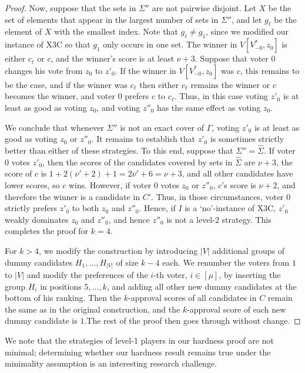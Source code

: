 \documentclass[11pt]{article}
\begin{document}
\begin{proof}
Now, suppose that the sets in $\Sigma''$ are not pairwise disjoint. 
Let $X$ be the set of elements that appear in the largest
number of sets in $\Sigma''$, and let $g_\ell$ be the element of $X$
with the smallest index. Note that $g_\ell\neq g_1$, since we modified our instance of X3C so that 
$g_1$ only occurs in one set.
The winner in $V[V^*_{-0}, z_0]$ is either $c_\ell$ or $c$, and the winner's score is at least $\nu+3$.
Suppose that voter $0$ changes his vote from $z_0$ to $z'_0$.
If the winner in $V[V^*_{-0}, z_0]$ was $c$, this remains to be the case, 
and if the winner was $c_\ell$ then either $c_\ell$ remains the winner or $c$ becomes the winner, 
and voter $0$ prefers $c$ to $c_\ell$. Thus, in this case voting $z'_0$
is at least as good as voting $z_0$, and voting $z''_0$ has the same effect as voting $z_0$.

We conclude that whenever $\Sigma''$ is not an exact cover of $\Gamma$, voting $z'_0$ is at least
as good as voting $z_0$ or $z''_0$. 
It remains to establish that $z'_0$ is sometimes strictly better than either of these strategies.
To this end, suppose that $\Sigma''=\widehat{\Sigma}$. 
If voter $0$ votes $z'_0$, then the scores of the candidates covered by sets in $\widehat{\Sigma}$
are $\nu+3$, the score of $c$ is $1+2(\nu'+2) +1 =2\nu'+6=\nu+3$, and all other candidates have lower scores, so $c$ wins.
However, if voter $0$ votes $z_0$ or $z''_0$, $c$'s score is $\nu+2$, and therefore the winner is a candidate in $C'$.
Thus, in those circumstances, voter $0$ strictly prefers $z'_0$ to both $z_0$ and $z''_0$.
Hence, if $I$ is a `no'-instance of X3C, $z'_0$ weakly dominates $z_0$ and $z''_0$, 
and hence $z''_0$ is not a level-2 strategy.
This completes the proof for $k=4$. 

For $k>4$, we modify the construction by introducing $|V|$ additional groups of dummy candidates
$H_1, \dots, H_{|V|}$ of size $k-4$ each. We renumber the voters from $1$ to $|V|$ and modify 
the preferences of the $i$-th voter, $i\in [\mu]$, by inserting the 
group $H_i$ in positions $5, \dots, k$, and adding all other new dummy candidates
at the bottom of his ranking. Then the $k$-approval scores of all candidates in $C$
remain the same as in the original construction, and the $k$-approval score of each new dummy candidate
is $1$.The rest of the proof then goes through without change. 
\end{proof}

We note that the strategies of level-1 players in our hardness proof are not minimal;
determining whether our hardness result remains true under the minimality assumption 
is an interesting research challenge.
\end{document}
